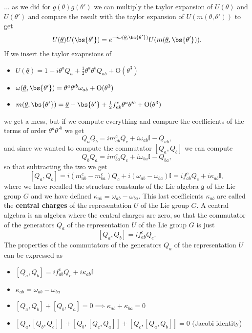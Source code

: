 ...
as we did for \(g(\theta)g(\theta')\) we can multiply the taylor expansion of \(U(\theta)\) and \(U(\theta')\) and compare the result with the taylor expansion of \(U(m(\theta, \theta'))\) to get
\[
    U(\underline{\theta}) U(\bs{\theta'}) = e^{-i \omega(\underline{\theta}, \bs{\theta'})} U(m(\underline{\theta}, \bs{\theta'})).
\]
If we insert the taylor exapnsions of
\begin{itemize}
    \item \(U(\underline{\theta}) = 1 - i \theta^a Q_a + \frac{1}{2} \theta^a \theta^b Q_{ab} + \mathrm{O}(\theta^3)\)
    \item \(\omega(\underline{\theta}, \bs{\theta'}) = \theta^a \theta'^b \omega_{ab} + \mathrm{O}(\theta^3)\)
    \item \(m(\underline{\theta}, \bs{\theta'}) = \underline{\theta} + \bs{\theta'} + \frac{1}{2} f_{ab}^c \theta^a \theta'^b + \mathrm{O}(\theta^3)\)
\end{itemize}
we get a mess, but if we compute everything and compare the coefficients of the terms of order \(\theta^a \theta'^b\) we get
\[
    Q_a Q_b = i m^c_{ab} Q_c + i \omega_{ab}\mathbb{I} - Q_{ab},
\]
and since we wanted to compute the commutator \(\left[ Q_a, Q_b \right]\) we can compute
\[
    Q_b Q_a = i m^c_{ba} Q_c + i \omega_{ba}\mathbb{I} - Q_{ba},
\]
so that subtracting the two we get
\[
    \left[ Q_a, Q_b \right] = i (m^c_{ab} - m^c_{ba}) Q_c + i (\omega_{ab} - \omega_{ba})\mathbb{I} = i f^c_{ab} Q_c + i \kappa_{ab} \mathbb{I},
\]
where we have recalled the structure constants of the Lie algebra \(\mathfrak{g}\) of the Lie group \(G\) and we have defined \(\kappa_{ab} = \omega_{ab} - \omega_{ba}\). This last coefficients \(\kappa_{ab}\) are called the \textbf{central charges} of the representation \(U\) of the Lie group \(G\). A central algebra is an algebra where the central charges are zero, so that the commutator of the generators \(Q_a\) of the representation \(U\) of the Lie group \(G\) is just
\[
    \left[ Q_a, Q_b \right] = i f^c_{ab} Q_c.
\]
The properties of the commutators of the generators \(Q_a\) of the representation \(U\) can be expressed as
\begin{itemize}
    \item \(\left[ Q_a, Q_b \right] = i f^c_{ab} Q_c + i \kappa_{ab} \mathbb{I}\)
    \item \(\kappa_{ab} = \omega_{ab} - \omega_{ba}\)
    \item \([Q_a,Q_b] + [Q_b,Q_a]=0 \implies \kappa_{ab}+ \kappa_{ba}=0\)
    \item \([Q_a,[Q_b,Q_c]] + [Q_b,[Q_c,Q_a]] + [Q_c,[Q_a,Q_b]]=0\) (Jacobi identity)
\end{itemize}

